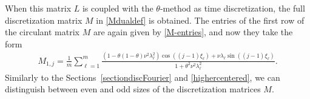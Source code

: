 \documentclass[a4paper]{article}
\begin{document}
When this matrix $L$ is coupled with the $\theta$-method as time discretization, the full discretization
matrix $M$ in \eqref{Mdualdef} is obtained.
The entries of the first row of the circulant matrix $M$ are again given by \eqref{M-entries}, and now
they take the form
\begin{align}\label{eq51}
	M_{1,j}  = \frac{1}{m} \sum_{\ell=1}^{m} \frac{\left(1-\theta(1-\theta)\nu^2\lambda_\ell^2\right)
  \cos((j-1)\xi_\ell) + \nu\lambda_\ell\sin((j-1)\xi_\ell)}{1+\theta^2\nu^2\lambda_\ell^2}.
\end{align}
Similarly to the Sections~\ref{sectiondiscFourier} and \ref{highercentered}, we can distinguish between even and
odd sizes of the discretization matrices $M$.
\end{document}
